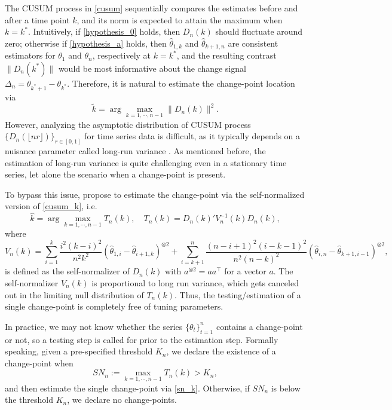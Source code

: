 The CUSUM process  in \eqref{cusum} sequentially compares the estimates before and after a time point $k$, and its norm is expected to attain the maximum when $k=k^*$. Intuitively, if \eqref{hypothesis_0} holds, then $D_n(k)$ should fluctuate around zero; otherwise if \eqref{hypothesis_a} holds, then $\hat{\theta}_{1,k}$ and $\hat{\theta}_{k+1,n}$ are consistent estimators for $\theta_1$ and $\theta_n$, respectively at $k=k^*$, and the resulting contrast $\|D_n(k^*)\|$ would be most informative about the change signal $\Delta_n=\theta_{k^*+1}-\theta_{k^*}$. Therefore, it is natural to estimate the change-point location via 
\begin{equation}\label{cusum_k}
	\tilde{k}=\arg\max_{k=1,\cdots,n-1}\|D_n(k)\|^2.
\end{equation}
However,   analyzing the  asymptotic 
distribution of CUSUM process $\{D_n(\lfloor n r\rfloor)\}_{r\in[0,1]}$ for time series data is  difficult, as it typically depends on a nuisance parameter called long-run variance \citep{newey1986simple,andrews1991heteroskedasticity}. As mentioned before, the estimation of long-run variance is quite challenging even in a stationary time series, let alone the scenario when a change-point is present.

To bypass this issue, \cite{zhao2021segmenting} propose to estimate the change-point via the self-normalized version of \eqref{cusum_k}, i.e. 
\begin{equation}\label{sn_k}
	\hat{k} = \arg \max_{k=1,\cdots,n-1}T_n(k),\quad T_n(k)=D_n(k)'V^{-1}_n(k)D_n(k),
\end{equation}
where \begin{equation}\label{V}
	V_n(k) =\sum_{i=1}^{k}\frac{i^2(k-i)^2}{n^2 k^2}(\hat{\theta}_{1,i}-\hat{\theta}_{i+1,k})^{\otimes 2} + \sum_{i=k+1}^{n}\frac{(n-i+1)^2(i-k-1)^2}{n^2(n-k)^2}(\hat{\theta}_{i,n}-\hat{\theta}_{k+1,i-1})^{\otimes 2},
\end{equation} is defined as the self-normalizer of $D_n(k)$ with $a^{\otimes 2}=aa^\top$ for a vector $a.$ The self-normalizer $V_n(k)$ is proportional to long run variance, which gets canceled out in the limiting null distribution of $T_n(k)$. Thus, the testing/estimation of a single change-point is completely free of tuning parameters. 


In practice, we may not know whether the series $\{\theta_t\}_{t=1}^n$ contains a change-point or not, so a testing step is called for prior to the estimation step.   Formally speaking,  given  a pre-specified threshold $K_n$, we declare the existence of a change-point when $$SN_n:=\max_{k=1,\cdots,n-1}T_n(k) > K_n,$$ 
and then estimate the single change-point via \eqref{sn_k}.
Otherwise, if $SN_n$ is below the threshold $K_n$, we declare no change-points.

